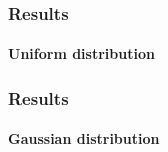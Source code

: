 \begin{frame}
\frametitle{Results}
\framesubtitle{Uniform distribution}
\begin{figure} 
	\centering
	
\end{figure}
\end{frame}

\begin{frame}
\frametitle{Results}
\framesubtitle{Gaussian distribution}
\begin{figure} 
	\centering
	
\end{figure}
\end{frame}

